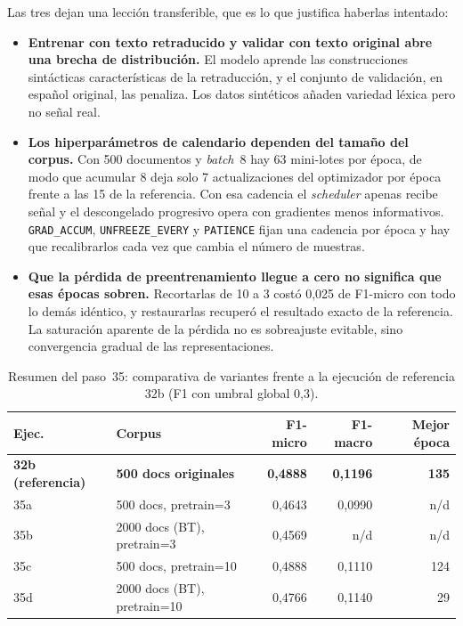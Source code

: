 Las tres dejan una lección transferible, que es lo que justifica haberlas intentado:

\begin{itemize}
 \item \textbf{Entrenar con texto retraducido y validar con texto original abre una brecha de distribución.} El modelo aprende las construcciones sintácticas características de la retraducción, y el conjunto de validación, en español original, las penaliza. Los datos sintéticos añaden variedad léxica pero no señal real.
 \item \textbf{Los hiperparámetros de calendario dependen del tamaño del corpus.} Con 500 documentos y \emph{batch}~8 hay 63 mini-lotes por época, de modo que acumular 8 deja solo 7 actualizaciones del optimizador por época frente a las 15 de la referencia. Con esa cadencia el \emph{scheduler} apenas recibe señal y el descongelado progresivo opera con gradientes menos informativos. \texttt{GRAD\_ACCUM}, \texttt{UNFREEZE\_EVERY} y \texttt{PATIENCE} fijan una cadencia por época y hay que recalibrarlos cada vez que cambia el número de muestras.
 \item \textbf{Que la pérdida de preentrenamiento llegue a cero no significa que esas épocas sobren.} Recortarlas de 10 a 3 costó 0,025 de F1-micro con todo lo demás idéntico, y restaurarlas recuperó el resultado exacto de la referencia. La saturación aparente de la pérdida no es sobreajuste evitable, sino convergencia gradual de las representaciones.
\end{itemize}

\begin{table}[h]
\centering
\small
\caption{Resumen del paso~35: comparativa de variantes frente a la ejecución de referencia 32b (F1 con umbral global 0,3).}
\label{tab:paso35}
\begin{tabular}{llrrr}
\hline
\textbf{Ejec.} & \textbf{Corpus} & \textbf{F1-micro} & \textbf{F1-macro} & \textbf{Mejor época} \\
\hline
\textbf{32b (referencia)} & \textbf{500 docs originales} & \textbf{0,4888} & \textbf{0,1196} & \textbf{135} \\
35a & 500 docs, pretrain=3 & 0,4643 & 0,0990 & n/d \\
35b & 2000 docs (BT), pretrain=3 & 0,4569 & n/d & n/d \\
35c & 500 docs, pretrain=10 & 0,4888 & 0,1110 & 124 \\
35d & 2000 docs (BT), pretrain=10 & 0,4766 & 0,1140 & 29 \\
\hline
\end{tabular}
\end{table}

